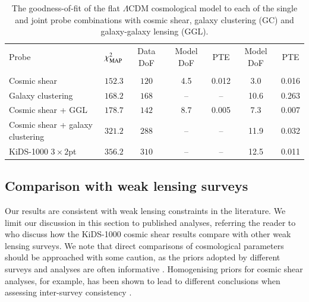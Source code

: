 \begin{table}
	\begin{center}
		\caption{The goodness-of-fit of the flat $\Lambda$CDM cosmological model to each of the single and joint probe combinations with cosmic shear, galaxy clustering (GC) and galaxy-galaxy lensing (GGL).}
		\label{tab:goodness-of-fit}
\begin{tabular}{lcccccc}
    \toprule
    Probe             & $\chi^2_{\rm MAP}$  & Data DoF  & Model DoF                   & PTE  & Model DoF          & PTE    \\
                      &                     &           &\citep{joachimi/etal:inprep} &      & \citep{Raveri2019} & \\
    \midrule
	Cosmic shear     & $152.3$ & $120$  &4.5 & 0.012 &3.0 & 0.016 \\
	Galaxy clustering & $168.2$ & $168$  &-- & -- &10.6 & 0.263 \\
	Cosmic shear + GGL & $178.7$ & $142$  &8.7 & 0.005 &7.3 & 0.007 \\
	Cosmic shear + galaxy clustering & $321.2$ & $288$  &-- & -- &11.9 & 0.032 \\
	KiDS-1000 $3\times2$pt & $356.2$ & $310$  &-- & -- &12.5 & 0.011 \\

    \bottomrule
\end{tabular}
	\end{center}
\end{table}

\subsection{Comparison with weak lensing surveys}
\label{sec:WL_comp}
Our results are consistent with weak lensing constraints in the literature.   We limit our discussion in this section to published \tttp analyses, referring the reader to \citet{asgari/etal:inprep} who discuss how the KiDS-1000 cosmic shear results compare with other weak lensing surveys.   We note that direct comparisons of cosmological parameters should be approached with some caution, as the priors adopted by different surveys and analyses are often informative \citep[see section 6.1 in][]{joachimi/etal:inprep}.   Homogenising priors for cosmic shear analyses, for example, has been shown to lead to different conclusions when assessing inter-survey consistency \citep{chang/etal:2019, joudaki/etal:2020, asgari/etal:2020_KD}.   

